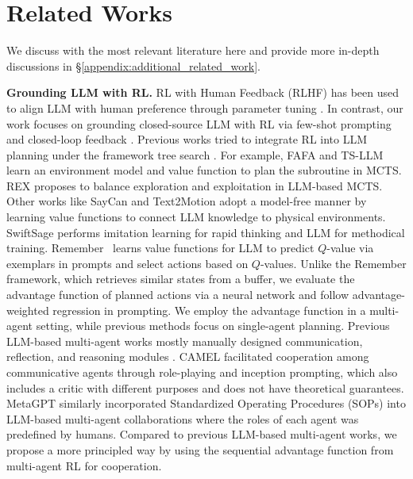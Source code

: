 \documentclass[11pt]{article}
\theoremstyle{plain}
\theoremstyle{remark}
\begin{document}
\section{Related Works}
We discuss with the most relevant literature here and provide more in-depth discussions in \S\ref{appendix:additional_related_work}.

\textbf{Grounding LLM with RL.} 
RL with Human Feedback (RLHF) has been used to align LLM with human preference through parameter tuning \citep{dai2023safe,fernandes2023bridging,song2023preference}. In contrast, our work focuses on grounding closed-source LLM with RL via few-shot prompting and closed-loop feedback \citep{zeng2023socratic,wu2023embodied,huang2022zero,lin2023grounded}. Previous works tried to integrate RL into LLM planning under the framework tree search \citep{browne2012survey}. For example, FAFA \citep{liu2023RAFA} and TS-LLM \citep{feng2023alphazero} learn an environment model and value function to plan the subroutine in MCTS. REX \citep{murthy2023rex} proposes to balance exploration and exploitation in LLM-based MCTS. Other works like SayCan \citep{ahn2022i} and Text2Motion \citep{Kevin2023Motion} adopt a model-free manner by learning value functions to connect LLM knowledge to physical environments. SwiftSage \citep{lin2023swiftsage} performs imitation learning for rapid thinking and LLM for methodical training. Remember~\citep{zhang2023large} learns value functions for LLM to predict $Q$-value via exemplars in prompts and select actions based on $Q$-values. Unlike the Remember framework, which retrieves similar states from a buffer, we evaluate the advantage function of planned actions via a neural network and follow advantage-weighted regression in prompting. We employ the advantage function in a multi-agent setting, while previous methods focus on single-agent planning. Previous LLM-based multi-agent works mostly manually designed communication, reflection, and reasoning modules \citep{zhang2023proagent,zhang2023building,Shyam2023MA,chen2023MA}. CAMEL \citep{li2023camel} facilitated cooperation among communicative agents through role-playing and inception prompting, which also includes a critic with different purposes and does not have theoretical guarantees. MetaGPT \citep{hong2023metagpt} similarly incorporated Standardized Operating Procedures (SOPs) into LLM-based multi-agent collaborations where the roles of each agent was predefined by humans. Compared to previous LLM-based multi-agent works, we propose a more principled way by using the sequential advantage function from multi-agent RL for cooperation. 
\end{document}
